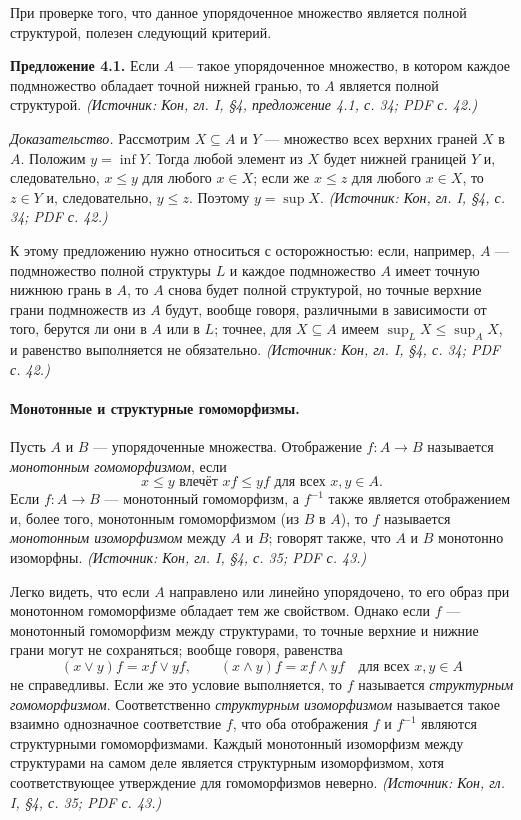\documentclass[a4paper,12pt]{article}
\begin{document}
При проверке того, что данное упорядоченное множество является полной структурой, полезен следующий критерий.

\textbf{Предложение 4.1.} Если \(A\) — такое упорядоченное множество, в котором каждое подмножество обладает точной нижней гранью, то \(A\) является полной структурой.
\textit{(Источник: Кон, гл. I, §4, предложение 4.1, с. 34; PDF с. 42.)}

\emph{Доказательство.} Рассмотрим \(X\subseteq A\) и \(Y\) — множество всех верхних граней \(X\) в \(A\). Положим \(y=\inf Y\). Тогда любой элемент из \(X\) будет нижней границей \(Y\) и, следовательно, \(x\le y\) для любого \(x\in X\); если же \(x\le z\) для любого \(x\in X\), то \(z\in Y\) и, следовательно, \(y\le z\). Поэтому \(y=\sup X\).
\textit{(Источник: Кон, гл. I, §4, с. 34; PDF с. 42.)}

К этому предложению нужно относиться с осторожностью: если, например, \(A\) — подмножество полной структуры \(L\) и каждое подмножество \(A\) имеет точную нижнюю грань в \(A\), то \(A\) снова будет полной структурой, но точные верхние грани подмножеств из \(A\) будут, вообще говоря, различными в зависимости от того, берутся ли они в \(A\) или в \(L\); точнее, для \(X\subseteq A\) имеем \(\sup_L X\le\sup_A X\), и равенство выполняется не обязательно.
\textit{(Источник: Кон, гл. I, §4, с. 34; PDF с. 42.)}

\paragraph{Монотонные и структурные гомоморфизмы.}
Пусть \(A\) и \(B\) — упорядоченные множества. Отображение \(f\colon A\to B\) называется \emph{монотонным гомоморфизмом}, если
\[
x\le y\text{ влечёт }xf\le yf\text{ для всех }x,y\in A.
\]
Если \(f\colon A\to B\) — монотонный гомоморфизм, а \(f^{-1}\) также является отображением и, более того, монотонным гомоморфизмом (из \(B\) в \(A\)), то \(f\) называется \emph{монотонным изоморфизмом} между \(A\) и \(B\); говорят также, что \(A\) и \(B\) монотонно изоморфны.
\textit{(Источник: Кон, гл. I, §4, с. 35; PDF с. 43.)}

Легко видеть, что если \(A\) направлено или линейно упорядочено, то его образ при монотонном гомоморфизме обладает тем же свойством. Однако если \(f\) — монотонный гомоморфизм между структурами, то точные верхние и нижние грани могут не сохраняться; вообще говоря, равенства
\[
(x\vee y)f=xf\vee yf,\qquad
(x\wedge y)f=xf\wedge yf\quad\text{для всех }x,y\in A
\]
не справедливы. Если же это условие выполняется, то \(f\) называется \emph{структурным гомоморфизмом}. Соответственно \emph{структурным изоморфизмом} называется такое взаимно однозначное соответствие \(f\), что оба отображения \(f\) и \(f^{-1}\) являются структурными гомоморфизмами. Каждый монотонный изоморфизм между структурами на самом деле является структурным изоморфизмом, хотя соответствующее утверждение для гомоморфизмов неверно.
\textit{(Источник: Кон, гл. I, §4, с. 35; PDF с. 43.)}
\end{document}
